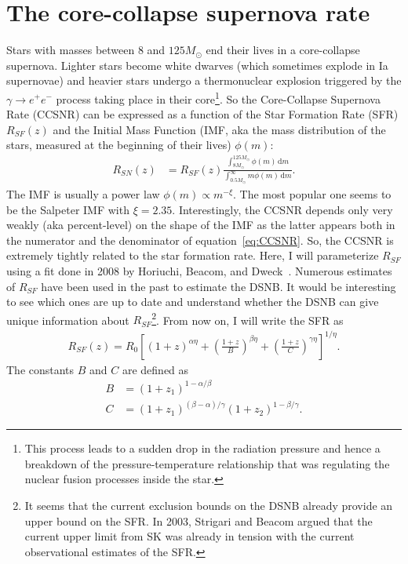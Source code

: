 \documentclass[12pt]{article}
\begin{document}
\section{The core-collapse supernova rate}
\label{sec:ccsnr}
Stars with masses between $8$ and $125 M_\odot$ end their lives in a core-collapse supernova. Lighter stars become white dwarves (which sometimes explode in Ia supernovae) and heavier stars undergo a thermonuclear explosion triggered by the $\gamma \rightarrow e^+ e^-$ process taking place in their core\footnote{This process leads to a sudden drop in the radiation pressure and hence a breakdown of the pressure-temperature relationship that was regulating the nuclear fusion processes inside the star.}. So the Core-Collapse Supernova Rate (CCSNR) can be expressed as a function of the Star Formation Rate (SFR) $R_{SF}(z)$ and the Initial Mass Function (IMF, aka the mass distribution of the stars, measured at the beginning of their lives) $\phi(m)$:
\begin{align}
    R_{SN}(z) &= R_{SF}(z)\frac{\int_{8M_\odot}^{125M_\odot}\phi(m)\,\mathrm{d}m}{\int_{0.5M_\odot}^\infty m \phi(m)\,\mathrm{d}m}.
    \label{eq:CCSNR}
\end{align}
The IMF is usually a power law $\phi(m)\propto m^{-\xi}$. The most popular one seems to be the Salpeter IMF with $\xi = 2.35$. Interestingly, the CCSNR depends only very weakly (aka percent-level) on the shape of the IMF as the latter appears both in the numerator and the denominator of equation~\ref{eq:CCSNR}. So, the CCSNR is extremely tightly related to the star formation rate. Here, I will parameterize $R_{SF}$ using a fit done in 2008 by Horiuchi, Beacom, and Dweck~\cite{Horiuchi:2008jz}. Numerous estimates of $R_{SF}$ have been used in the past to estimate the DSNB. It would be interesting to see which ones are up to date and understand whether the DSNB can give unique information about $R_{SF}$\footnote{It seems that the current exclusion bounds on the DSNB already provide an upper bound on the SFR. In 2003, Strigari and Beacom argued that the current upper limit from SK was already in tension with the current observational estimates of the SFR.}. From now on, I will write the SFR as
\begin{align}
    R_{SF}(z) = R_0 \left[(1 + z)^{\alpha\eta} + \left(\frac{1 + z}{B}\right)^{\beta\eta} + \left(\frac{1 + z}{C}\right)^{\gamma\eta}\right]^{1/\eta}.
    \label{eq:SFR}
\end{align}
The constants $B$ and $C$ are defined as
\begin{align}
    B &= (1 + z_1)^{1 - \alpha/\beta}\\
    C &= (1 + z_1)^{(\beta - \alpha)/\gamma}(1 + z_2)^{1 - \beta/\gamma}.
\end{align}
\end{document}
